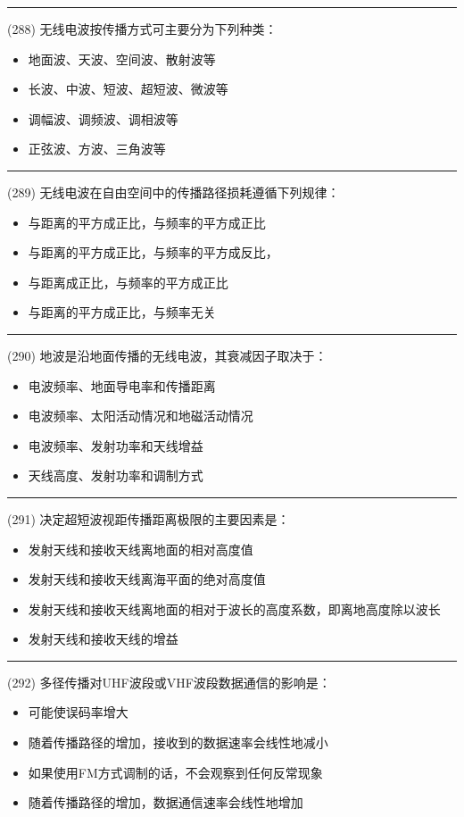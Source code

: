\documentclass[twocolumn]{ctexart}  %
\begin{document}
\noindent\rule{0.5\textwidth}{1pt}
\heiti (288) 无线电波按传播方式可主要分为下列种类： \songti {\color{gray} [LK1058] }
\begin{itemize}
	\item  地面波、天波、空间波、散射波等
	\item  长波、中波、短波、超短波、微波等
	\item  调幅波、调频波、调相波等
	\item  正弦波、方波、三角波等
\end{itemize}


\noindent\rule{0.5\textwidth}{1pt}
\heiti (289) 无线电波在自由空间中的传播路径损耗遵循下列规律： \songti {\color{gray} [LK1060] }
\begin{itemize}
	\item  与距离的平方成正比，与频率的平方成正比
	\item  与距离的平方成正比，与频率的平方成反比，
	\item  与距离成正比，与频率的平方成正比
	\item  与距离的平方成正比，与频率无关
\end{itemize}


\noindent\rule{0.5\textwidth}{1pt}
\heiti (290) 地波是沿地面传播的无线电波，其衰减因子取决于： \songti {\color{gray} [LK1067] }
\begin{itemize}
	\item  电波频率、地面导电率和传播距离
	\item  电波频率、太阳活动情况和地磁活动情况
	\item  电波频率、发射功率和天线增益
	\item  天线高度、发射功率和调制方式
\end{itemize}


\noindent\rule{0.5\textwidth}{1pt}
\heiti (291) 决定超短波视距传播距离极限的主要因素是： \songti {\color{gray} [LK1068] }
\begin{itemize}
	\item  发射天线和接收天线离地面的相对高度值
	\item  发射天线和接收天线离海平面的绝对高度值
	\item  发射天线和接收天线离地面的相对于波长的高度系数，即离地高度除以波长
	\item  发射天线和接收天线的增益
\end{itemize}


\noindent\rule{0.5\textwidth}{1pt}
\heiti (292) 多径传播对UHF波段或VHF波段数据通信的影响是： \songti {\color{gray} [LK1104] }
\begin{itemize}
	\item  可能使误码率增大
	\item  随着传播路径的增加，接收到的数据速率会线性地减小
	\item  如果使用FM方式调制的话，不会观察到任何反常现象
	\item  随着传播路径的增加，数据通信速率会线性地增加
\end{itemize}
\end{document}
